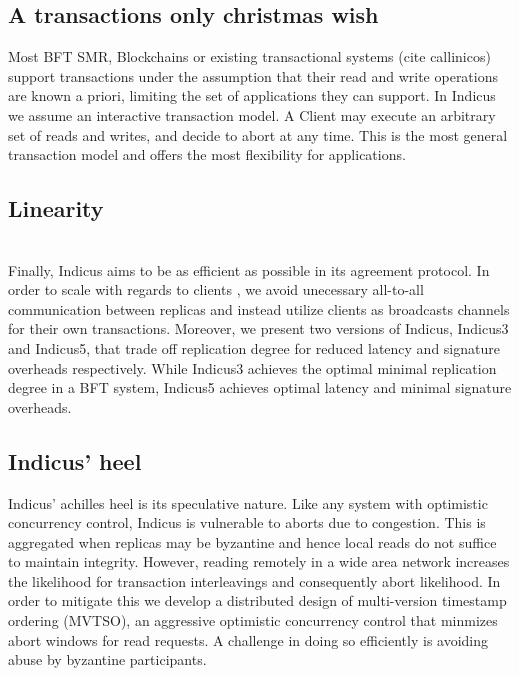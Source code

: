 \subsection{A transactions only christmas wish}
Most BFT SMR, Blockchains or existing transactional systems (cite callinicos) support transactions under the assumption that their read and write operations are known a priori, limiting the set of applications they can support. In Indicus we assume an interactive transaction model. A Client may execute an arbitrary set of reads and writes, and decide to abort at any time. This is the most general transaction model and offers the most flexibility for applications.



\subsection{Linearity}
\\
Finally, Indicus aims to be as efficient as possible in its agreement protocol. In order to scale with regards to clients , we avoid unecessary all-to-all communication between replicas and instead utilize clients as broadcasts channels for their own transactions. Moreover, we present two versions of Indicus, Indicus3 and Indicus5, that trade off replication degree for reduced latency and signature overheads respectively. While Indicus3 achieves the optimal minimal replication degree in a BFT system, Indicus5 achieves optimal latency and minimal signature overheads.


\subsection{Indicus' heel}
Indicus' achilles heel is its speculative nature. Like any system with optimistic concurrency control, Indicus is vulnerable to aborts due to congestion. This is aggregated when replicas may be byzantine and hence local reads do not suffice to maintain integrity. However, reading remotely in a wide area network increases the likelihood for transaction interleavings and consequently abort likelihood. In order to mitigate this we develop a distributed design of multi-version timestamp ordering (MVTSO), an aggressive optimistic concurrency control that minmizes abort windows for read requests. A challenge in doing so efficiently is avoiding abuse by byzantine participants. 

